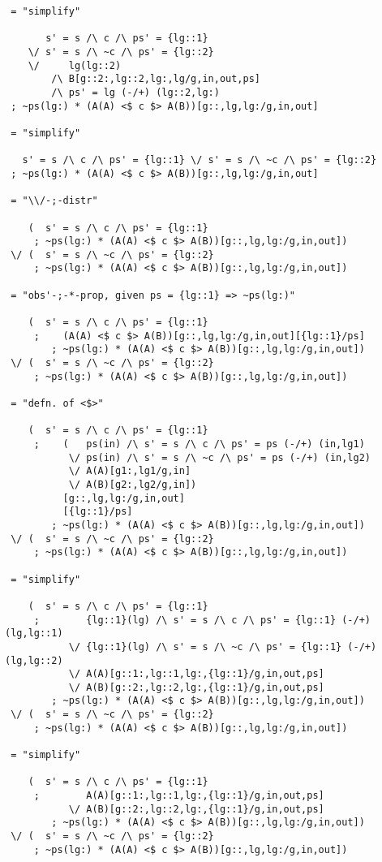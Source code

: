 \begin{verbatim}
 = "simplify"

       s' = s /\ c /\ ps' = {lg::1}
    \/ s' = s /\ ~c /\ ps' = {lg::2}
    \/     lg(lg::2)
        /\ B[g::2:,lg::2,lg:,lg/g,in,out,ps]
        /\ ps' = lg (-/+) (lg::2,lg:)
 ; ~ps(lg:) * (A(A) <$ c $> A(B))[g::,lg,lg:/g,in,out]

 = "simplify"

   s' = s /\ c /\ ps' = {lg::1} \/ s' = s /\ ~c /\ ps' = {lg::2}
 ; ~ps(lg:) * (A(A) <$ c $> A(B))[g::,lg,lg:/g,in,out]

 = "\\/-;-distr"

    (  s' = s /\ c /\ ps' = {lg::1}
     ; ~ps(lg:) * (A(A) <$ c $> A(B))[g::,lg,lg:/g,in,out])
 \/ (  s' = s /\ ~c /\ ps' = {lg::2}
     ; ~ps(lg:) * (A(A) <$ c $> A(B))[g::,lg,lg:/g,in,out])

 = "obs'-;-*-prop, given ps = {lg::1} => ~ps(lg:)"

    (  s' = s /\ c /\ ps' = {lg::1}
     ;    (A(A) <$ c $> A(B))[g::,lg,lg:/g,in,out][{lg::1}/ps]
        ; ~ps(lg:) * (A(A) <$ c $> A(B))[g::,lg,lg:/g,in,out])
 \/ (  s' = s /\ ~c /\ ps' = {lg::2}
     ; ~ps(lg:) * (A(A) <$ c $> A(B))[g::,lg,lg:/g,in,out])

 = "defn. of <$>"

    (  s' = s /\ c /\ ps' = {lg::1}
     ;    (   ps(in) /\ s' = s /\ c /\ ps' = ps (-/+) (in,lg1)
           \/ ps(in) /\ s' = s /\ ~c /\ ps' = ps (-/+) (in,lg2)
           \/ A(A)[g1:,lg1/g,in]
           \/ A(B)[g2:,lg2/g,in])
          [g::,lg,lg:/g,in,out]
          [{lg::1}/ps]
        ; ~ps(lg:) * (A(A) <$ c $> A(B))[g::,lg,lg:/g,in,out])
 \/ (  s' = s /\ ~c /\ ps' = {lg::2}
     ; ~ps(lg:) * (A(A) <$ c $> A(B))[g::,lg,lg:/g,in,out])

 = "simplify"

    (  s' = s /\ c /\ ps' = {lg::1}
     ;        {lg::1}(lg) /\ s' = s /\ c /\ ps' = {lg::1} (-/+) (lg,lg::1)
           \/ {lg::1}(lg) /\ s' = s /\ ~c /\ ps' = {lg::1} (-/+) (lg,lg::2)
           \/ A(A)[g::1:,lg::1,lg:,{lg::1}/g,in,out,ps]
           \/ A(B)[g::2:,lg::2,lg:,{lg::1}/g,in,out,ps]
        ; ~ps(lg:) * (A(A) <$ c $> A(B))[g::,lg,lg:/g,in,out])
 \/ (  s' = s /\ ~c /\ ps' = {lg::2}
     ; ~ps(lg:) * (A(A) <$ c $> A(B))[g::,lg,lg:/g,in,out])

 = "simplify"

    (  s' = s /\ c /\ ps' = {lg::1}
     ;        A(A)[g::1:,lg::1,lg:,{lg::1}/g,in,out,ps]
           \/ A(B)[g::2:,lg::2,lg:,{lg::1}/g,in,out,ps]
        ; ~ps(lg:) * (A(A) <$ c $> A(B))[g::,lg,lg:/g,in,out])
 \/ (  s' = s /\ ~c /\ ps' = {lg::2}
     ; ~ps(lg:) * (A(A) <$ c $> A(B))[g::,lg,lg:/g,in,out])


\end{verbatim}
